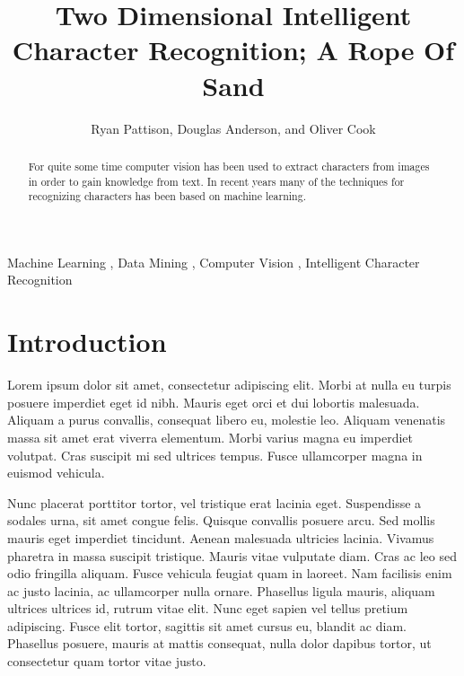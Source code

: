 \documentclass[preprint,5p,times,twocolumn]{elsarticle}
\begin{document}
\begin{frontmatter}

\title{Two Dimensional Intelligent Character Recognition; A Rope Of Sand}


\author[ryan,doug,oliver]{Ryan Pattison, Douglas Anderson, and Oliver Cook}

\address[ryan]{ryan.m.pattison@gmail.com}
\address[doug]{dander01@uoguelph.ca}
\address[oliver]{cooko@uoguelph.ca}
 
\begin{abstract}

For quite some time computer vision has been used to extract characters from
images in order to gain knowledge from text. In recent years many of the
techniques for recognizing characters has been based on machine learning.

\end{abstract}

\begin{keyword}
Machine Learning \sep
Data Mining \sep
Computer Vision \sep
Intelligent Character Recognition


\end{keyword}

\end{frontmatter}


\section{Introduction}
\label{intro}
Lorem ipsum dolor sit amet, consectetur adipiscing elit. Morbi at nulla eu
turpis posuere imperdiet eget id nibh. Mauris eget orci et dui lobortis
malesuada. Aliquam a purus convallis, consequat libero eu, molestie leo.
Aliquam venenatis massa sit amet erat viverra elementum. Morbi varius magna eu
imperdiet volutpat. Cras suscipit mi sed ultrices tempus. Fusce ullamcorper
magna in euismod vehicula.


Nunc placerat porttitor tortor, vel tristique erat lacinia eget. Suspendisse a
sodales urna, sit amet congue felis. Quisque convallis posuere arcu. Sed mollis
mauris eget imperdiet tincidunt. Aenean malesuada ultricies lacinia. Vivamus
pharetra in massa suscipit tristique. Mauris vitae vulputate diam. Cras ac leo
sed odio fringilla aliquam. Fusce vehicula feugiat quam in laoreet. Nam
facilisis enim ac justo lacinia, ac ullamcorper nulla ornare. Phasellus ligula
mauris, aliquam ultrices ultrices id, rutrum vitae elit. Nunc eget sapien vel
tellus pretium adipiscing. Fusce elit tortor, sagittis sit amet cursus eu,
blandit ac diam. Phasellus posuere, mauris at mattis consequat, nulla dolor
dapibus tortor, ut consectetur quam tortor vitae justo.
\end{document}
